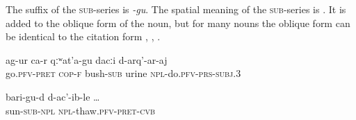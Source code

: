 The suffix of the \textsc{sub}-series is \textit{-gu}. The spatial meaning of the \textsc{sub}-series is . It is added to the oblique form of the noun, but for many nouns the oblique form can be identical to the citation form , , . 
%
\begin{exe}
	\ex	\label{(She) went to pee under the bushes}
	\gll	ag-ur ca-r	qːʷat'a-gu	dacːi	d-arq'-ar-aj \\
		go.\textsc{pfv}-\textsc{pret} \textsc{cop-f}	bush-\textsc{sub}	urine	\textsc{npl}-do.\textsc{pfv}-\textsc{prs}-\textsc{subj}.3\\
	\glt	{}

	
	\ex	\label{when (the worms) dissolved in the sun}
	\gll	bari-gu-d	d-ac'-ib-le	\ldots\\
		sun-\textsc{sub}-\textsc{npl}	\textsc{npl}-thaw.\textsc{pfv}-\textsc{pret}-\textsc{cvb}\\
	\glt	{}
\end{exe}	

